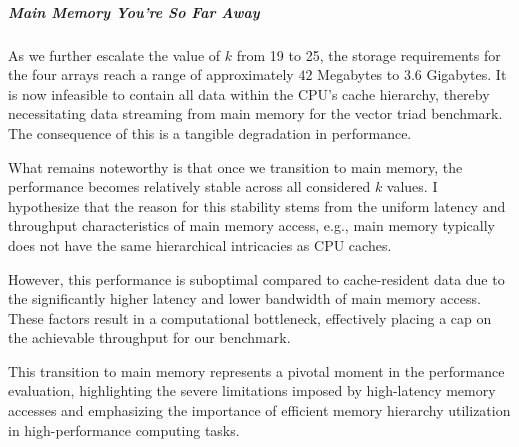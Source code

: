 \documentclass{article}
\begin{document}
\subparagraph*{Main Memory You're So Far Away} 
As we further escalate the value of \( k \) from 19 to 25, the storage requirements for the four arrays reach a range of approximately \( 42 \) Megabytes to \( 3.6 \) Gigabytes.
It is now infeasible to contain all data within the CPU's cache hierarchy, thereby necessitating data streaming from main memory for the vector triad benchmark. The consequence of this is a tangible degradation in performance. 

What remains noteworthy is that once we transition to main memory, the performance becomes relatively stable across all considered \( k \) values. I hypothesize that the reason for this stability stems from the uniform latency and throughput characteristics of main memory access, e.g., main memory typically does not have the same hierarchical intricacies as CPU caches. 

However, this performance is suboptimal compared to cache-resident data due to the significantly higher latency and lower bandwidth of main memory access. These factors result in a computational bottleneck, effectively placing a cap on the achievable throughput for our benchmark.

This transition to main memory represents a pivotal moment in the performance evaluation, highlighting the severe limitations imposed by high-latency memory accesses and emphasizing the importance of efficient memory hierarchy utilization in high-performance computing tasks.
\end{document}

